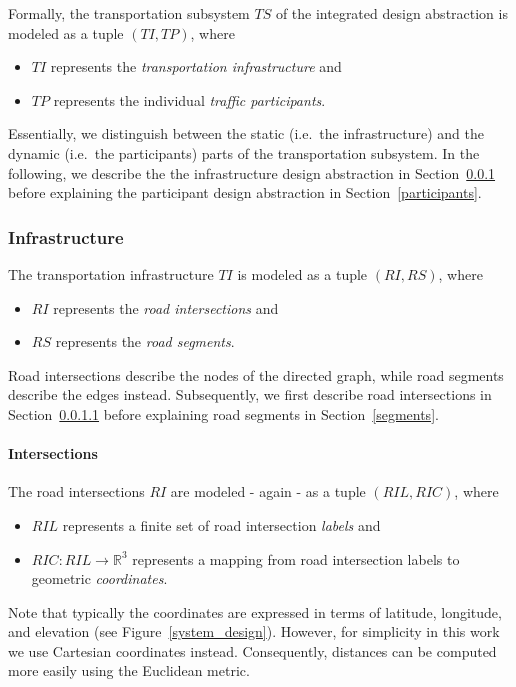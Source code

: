 Formally, the transportation subsystem $TS$ of the integrated design abstraction is modeled as a tuple $(TI, TP)$, where
\begin{itemize}
	\item $TI$ represents the \textit{transportation infrastructure} and
	\item $TP$ represents the individual \textit{traffic participants}.
\end{itemize}
Essentially, we distinguish between the static (i.e.\ the infrastructure) and the dynamic (i.e.\ the participants) parts of the transportation subsystem. In the following, we describe the the infrastructure design abstraction in Section~\ref{transport_infrastructure} before explaining the participant design abstraction in Section~\ref{participants}.

\subsubsection{Infrastructure}
\label{transport_infrastructure}

The transportation infrastructure $TI$ is modeled as a tuple $(RI, RS)$, where
\begin{itemize}
	\item $RI$ represents the \textit{road intersections} and
	\item $RS$ represents the \textit{road segments}.
\end{itemize}
Road intersections describe the nodes of the directed graph, while road segments describe the edges instead. Subsequently, we first describe road intersections in Section~\ref{intersections} before explaining road segments in Section~\ref{segments}.

\paragraph{Intersections}
\label{intersections}

The road intersections $RI$ are modeled - again - as a tuple $(RIL, RIC)$, where
\begin{itemize}
	\item $RIL$ represents a finite set of road intersection \textit{labels} and
	\item $RIC: RIL \rightarrow \mathbb{R}^3$ represents a mapping from road intersection labels to geometric \textit{coordinates}.
\end{itemize}
Note that typically the coordinates are expressed in terms of latitude, longitude, and elevation (see Figure~\ref{system_design}). However, for simplicity in this work we use Cartesian coordinates instead. Consequently, distances can be computed more easily using the Euclidean metric. 

